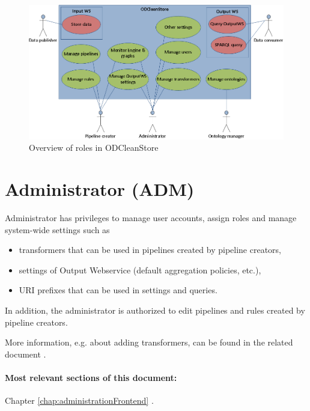 \begin{figure}[!htb]
    \centering
    \includegraphics[width=\textwidth]{images/use-cases.png}
    \caption{Overview of roles in ODCleanStore}
	\label{fig:odcsUseCases}
\end{figure}

\section[Administrator]{Administrator (ADM)}
\label{sec:adm}

	Administrator has privileges to manage user accounts, assign roles and manage system-wide settings such as
	\begin{itemize}
		\item transformers that can be used in pipelines created by pipeline creators,
		\item settings of Output Webservice (default aggregation policies, etc.),
		\item URI prefixes that can be used in settings and queries.
	\end{itemize}

	In addition, the administrator is authorized to edit pipelines and rules created by pipeline creators.



	More information, e.g. about adding transformers, can be found in the related document .

	\paragraph{Most relevant sections of this document:} Chapter \ref{chap:administrationFrontend} .

